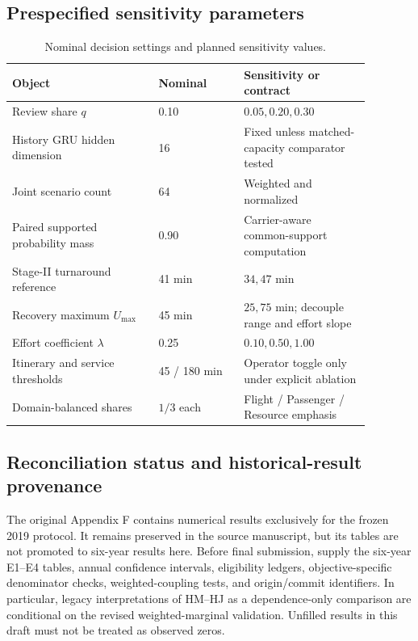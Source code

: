 \documentclass[10pt,a4paper]{article}
\numberwithin{equation}{section}
\begin{document}
\subsection{Prespecified sensitivity parameters}
\begin{table}[htbp]\centering\footnotesize
\caption{Nominal decision settings and planned sensitivity values.}
\label{tab:sup_parameters}
\begin{tabular}{p{0.36\linewidth}p{0.21\linewidth}p{0.31\linewidth}}\toprule
Object & Nominal & Sensitivity or contract \\\midrule
Review share $q$ & 0.10 & $0.05,0.20,0.30$ \\
History GRU hidden dimension & 16 & Fixed unless matched-capacity comparator tested \\
Joint scenario count & 64 & Weighted and normalized \\
Paired supported probability mass & 0.90 & Carrier-aware common-support computation \\
Stage-II turnaround reference & 41 min & $34,47$ min \\
Recovery maximum $U_{\max}$ & 45 min & $25,75$ min; decouple range and effort slope \\
Effort coefficient $\lambda$ & 0.25 & $0.10,0.50,1.00$ \\
Itinerary and service thresholds & 45 / 180 min & Operator toggle only under explicit ablation \\
Domain-balanced shares & $1/3$ each & Flight / Passenger / Resource emphasis \\\bottomrule
\end{tabular}\end{table}

\subsection{Reconciliation status and historical-result provenance}
The original Appendix F contains numerical results exclusively for the frozen 2019 protocol. It remains preserved in the source manuscript, but its tables are not promoted to six-year results here. Before final submission, supply the six-year E1--E4 tables, annual confidence intervals, eligibility ledgers, objective-specific denominator checks, weighted-coupling tests, and origin/commit identifiers. In particular, legacy interpretations of HM--HJ as a dependence-only comparison are conditional on the revised weighted-marginal validation. Unfilled results in this draft must not be treated as observed zeros.
\end{document}
